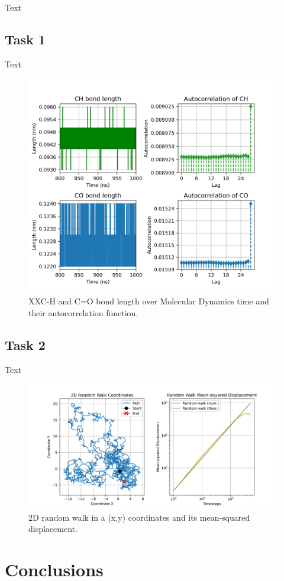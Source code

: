 \documentclass{article}
\begin{document}
Text

\subsection{Task 1}

Text 

\begin{figure}[H]
\includegraphics[width=\linewidth]{CO_CH_length_acf_plot.png}
\caption{XXC-H and C=O bond length over Molecular Dynamics time and their autocorrelation function.}
\label{acf_plot}
\end{figure}




\subsection{Task 2}


Text

\begin{figure}[H]
\includegraphics[width=\linewidth]{msd_plot.png}
\caption{2D random walk in a (x,y) coordinates and its mean-squared displacement.}
\label{msd_plot}
\end{figure}



\section{Conclusions}



\end{document}
